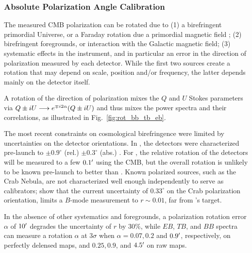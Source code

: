 \documentclass[PICOReport.tex]{subfiles}
\begin{document}
\subsubsection{Absolute Polarization Angle Calibration}
\label{sec:angle}

The measured CMB polarization can be rotated due to (1) a birefringent primordial Universe, or a Faraday rotation
due a primordial magnetic field \citep{Pogosian+2018}; (2) birefringent
foregrounds, or interaction with the Galactic magnetic field;
(3) systematic effects in the instrument, and in particular an error in
the direction of polarization measured by each detector.  
While the first two sources create a rotation that may depend on scale,
position and/or frequency, the latter depends mainly on
the detector itself. 

A rotation {\prang} of the direction of polarization mixes the $Q$ and $U$ Stokes parameters via
$Q\pm iU \longrightarrow e^{\mp i 2 \alpha} (Q\pm iU)$
and thus mixes the power spectra and their correlations, as illustrated in Fig.~\ref{fig:rot_bb_tb_eb}.



The most recent constraints on cosmological birefringence \citep{Planck2016_XLIX} were limited by uncertainties on the detector orientations.  In \planck, the detectors were characterized pre-launch to $\pm 0.9^\circ$ (rel.) $\pm 0.3^\circ$ (abs.) \citep{Rosset+2010}. For \pico, the relative rotation of the detectors will be measured to a few $0.1'$ using the CMB, but the overall rotation is unlikely to be known pre-launch to better than \planck.  Known polarized sources, such as the Crab Nebula, are not characterized well enough independently to serve as calibrators; \citet{Aumont+2018} show that the current uncertainty of $0.33^\circ$ on the Crab polarization orientation, limits a $B$-mode measurement to $r \sim 0.01$, far from \pico's target.


In the absence of other systematics and foregrounds, a polarization rotation error $\alpha$ of $10'$ degrades 
the uncertainty of $r$ by 30\%, while $EB$, $TB$, and $BB$ spectra can measure a rotation $\alpha$ at 3$\sigma$ when $\alpha = 0.07, 0.2$  and $0.9'$, respectively,
 on perfectly delensed maps, and $0.25, 0.9$, and $4.5'$ on raw maps.
\end{document}
